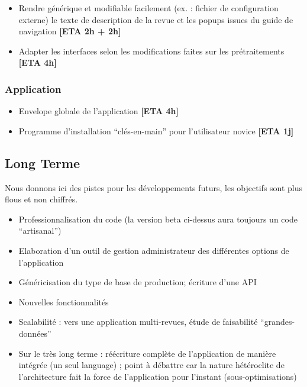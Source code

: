 \documentclass[11pt]{article}
\begin{document}
\begin{itemize}
\item Rendre générique et modifiable facilement (ex. : fichier de configuration externe) le texte de description de la revue et les popups issues du guide de navigation \textbf{[ETA 2h + 2h]}
\item Adapter les interfaces selon les modifications faites sur les prétraitements \textbf{[ETA 4h]}
\end{itemize}


\subsubsection*{Application}

\begin{itemize}
\item Envelope globale de l'application \textbf{[ETA 4h]}
\item Programme d'installation ``clés-en-main'' pour l'utilisateur novice \textbf{[ETA 1j]}
\end{itemize}





\subsection{Long Terme}

Nous donnons ici des pistes pour les développements futurs, les objectifs sont plus flous et non chiffrés.

\begin{itemize}
\item Professionnalisation du code (la version beta ci-dessus aura toujours un code ``artisanal'')
\item Elaboration d'un outil de gestion administrateur des différentes options de l'application
\item Généricisation du type de base de production; écriture d'une API
\item Nouvelles fonctionnalités
\item Scalabilité : vers une application multi-revues, étude de faisabilité ``grandes-données''
\item Sur le très long terme : réécriture complète de l'application de manière intégrée (un seul language) ; point à débattre car la nature hétéroclite de l'architecture fait la force de l'application pour l'instant (sous-optimisations) 
\end{itemize}
\end{document}
